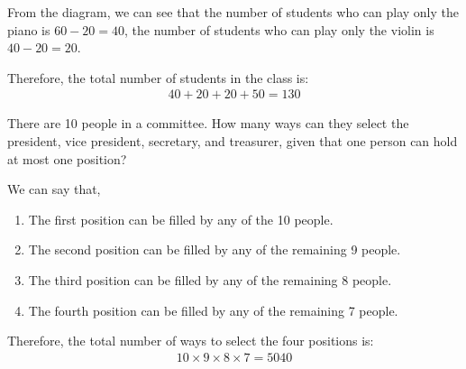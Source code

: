 \documentclass[a4paper, 10pt]{article}
\begin{document}
\begin{solution}
	\par
	\begin{center}
	\end{center}

	\par From the diagram, we can see that the number of students who can play only the piano is \( 60 - 20 = 40 \),
	the number of students who can play only the violin is \( 40 - 20 = 20 \).
	
	\myspace

	\par Therefore, the total number of students in the class is:
	\begin{align*}
		40 + 20 + 20 + 50 = \boxed{130}
	\end{align*}
\end{solution}

\begin{problem}
There are 10 people in a committee.
How many ways can they select the president, vice president, secretary, and treasurer,
given that one person can hold at most one position?
\end{problem}

\begin{solution}
	We can say that,
	\begin{enumerate}[wide=0pt, itemsep=2pt, parsep=0pt, leftmargin=*]
		\item The first position can be filled by any of the 10 people.
		\item The second position can be filled by any of the remaining 9 people.
		\item The third position can be filled by any of the remaining 8 people.
		\item The fourth position can be filled by any of the remaining 7 people.
	\end{enumerate}

	Therefore, the total number of ways to select the four positions is:
	\begin{align*}
		10 \times 9 \times 8 \times 7 = \boxed{5040}
	\end{align*}
\end{solution}
\end{document}
